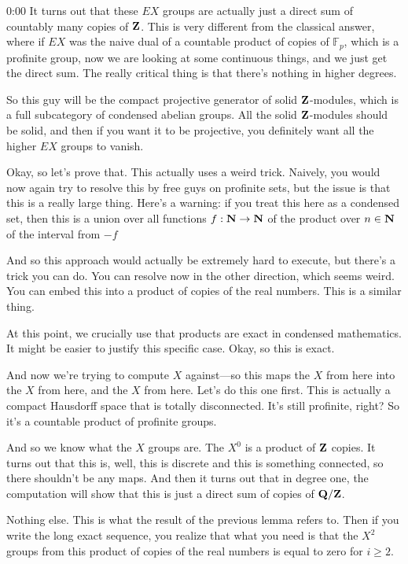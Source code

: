 \begin{unfinished}{0:00}
It turns out that these $EX$ groups are actually just a direct sum of countably many copies of $\mathbf Z$. This is very different from the classical answer, where if $EX$ was the naive dual of a countable product of copies of $\mathbb{F}_p$, which is a profinite group, now we are looking at some continuous things, and we just get the direct sum. The really critical thing is that there's nothing in higher degrees.

So this guy will be the compact projective generator of solid $\mathbf Z$-modules, which is a full subcategory of condensed abelian groups. All the solid $\mathbf Z$-modules should be solid, and then if you want it to be projective, you definitely want all the higher $EX$ groups to vanish.

Okay, so let's prove that. This actually uses a weird trick. Naively, you would now again try to resolve this by free guys on profinite sets, but the issue is that this is a really large thing. Here's a warning: if you treat this here as a condensed set, then this is a union over all functions $f: \mathbf N \to \mathbf N$ of the product over $n \in \mathbf N$ of the interval from $-f$

And so this approach would actually be extremely hard to execute, but there's a trick you can do. You can resolve now in the other direction, which seems weird. You can embed this into a product of copies of the real numbers. This is a similar thing.

At this point, we crucially use that products are exact in condensed mathematics. It might be easier to justify this specific case. Okay, so this is exact.

And now we're trying to compute $X$ against---so this maps the $X$ from here into the $X$ from here, and the $X$ from here. Let's do this one first. This is actually a compact Hausdorff space that is totally disconnected. It's still profinite, right? So it's a countable product of profinite groups.

And so we know what the $X$ groups are. The $X^0$ is a product of $\mathbf Z$ copies. It turns out that this is, well, this is discrete and this is something connected, so there shouldn't be any maps. And then it turns out that in degree one, the computation will show that this is just a direct sum of copies of $\mathbf Q/\mathbf Z$.

Nothing else. This is what the result of the previous lemma refers to. Then if you write the long exact sequence, you realize that what you need is that the $X^2$ groups from this product of copies of the real numbers is equal to zero for $i \geq 2$.


\end{unfinished}
